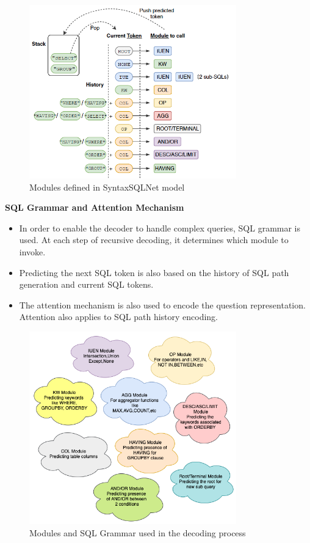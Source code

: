 \begin{figure}[htb]
    \centering
    \includegraphics[width=0.8\textwidth]{pics/SyntaxSQLNet/Grammar.png}
    \caption{Modules defined in SyntaxSQLNet model}
    \label{fig:grammar}
\end{figure}


\textbf{SQL Grammar and Attention Mechanism}

\begin{itemize}
    \item In order to enable the decoder to handle complex queries, SQL grammar is used. At each step of recursive decoding, it determines which module to invoke.
    \item Predicting the next SQL token is also based on the history of SQL path generation and current SQL tokens.
    \item The attention mechanism is also used to encode the question representation. Attention also applies to SQL path history encoding.
\end{itemize}

\begin{figure}[htb]
    \centering
    \includegraphics[width=0.8\textwidth]{pics/SyntaxSQLNet/Modules.png}
    \caption{Modules and SQL Grammar used in the decoding process}
    \label{fig:modules}
\end{figure}


